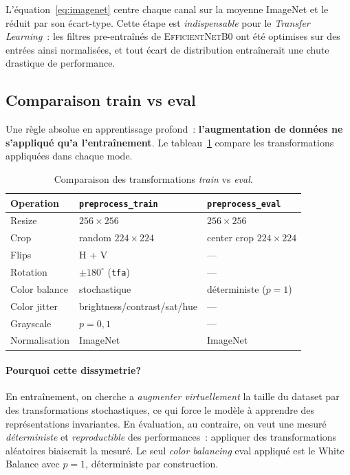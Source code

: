 \documentclass[12pt,a4paper,openany]{report}
\begin{document}
L'équation~\eqref{eq:imagenet} centre chaque canal sur la moyenne ImageNet et le réduit par son écart-type. Cette étape est \emph{indispensable} pour le \emph{Transfer Learning}~: les filtres pre-entraînés de \textsc{EfficientNetB0} ont été optimises sur des entrées ainsi normalisées, et tout écart de distribution entraînerait une chute drastique de performance.

\subsection{Comparaison train vs eval}

Une règle absolue en apprentissage profond~: \textbf{l'augmentation de données ne s'appliqué qu'a l'entraînement}. Le tableau~\ref{tab:traineval} compare les transformations appliquées dans chaque mode.

\begin{table}[H]
\centering\small
\begin{tabular}{lll}
\toprule
\textbf{Operation} & \texttt{preprocess\_train} & \texttt{preprocess\_eval} \\
\midrule
Resize         & $256\times256$             & $256\times256$ \\
Crop           & random $224\times224$      & center crop $224\times224$ \\
Flips          & H + V                      & --- \\
Rotation       & $\pm 180^\circ$ (\texttt{tfa})  & --- \\
Color balance  & stochastique               & déterministe ($p=1$) \\
Color jitter   & brightness/contrast/sat/hue & --- \\
Grayscale      & $p=0{,}1$                  & --- \\
Normalisation  & ImageNet                   & ImageNet \\
\bottomrule
\end{tabular}
\caption{Comparaison des transformations \emph{train} vs \emph{eval}.}
\label{tab:traineval}
\end{table}

\paragraph{Pourquoi cette dissymetrie?}
En entraînement, on cherche a \emph{augmenter virtuellement} la taille du dataset par des transformations stochastiques, ce qui force le modèle à apprendre des représentations invariantes. En évaluation, au contraire, on veut une mesuré \emph{déterministe} et \emph{reproductible} des performances~: appliquer des transformations aléatoires biaiserait la mesuré. Le seul \emph{color balancing} eval appliqué est le White Balance avec $p=1$, déterministe par construction.
\end{document}
